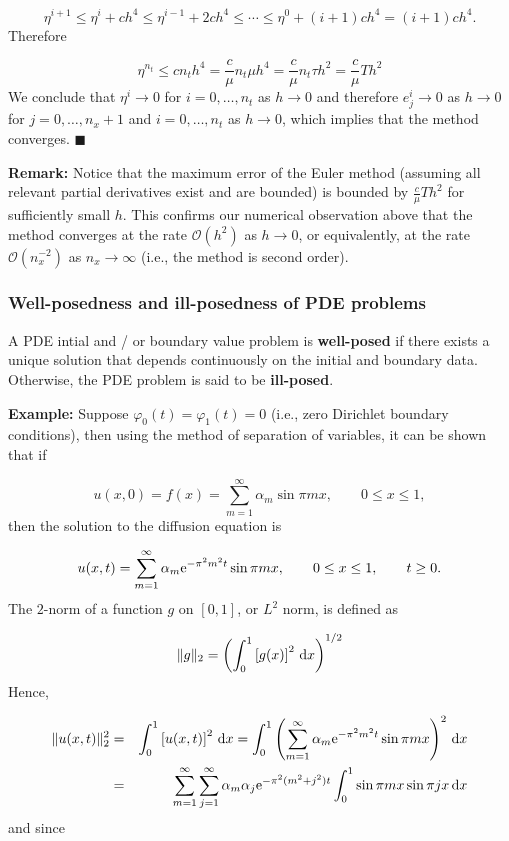 \documentclass[12pt,a4paper]{article}
\begin{document}
\[
\eta^{i+1} \leq \eta^i  + ch^4 \leq \eta^{i-1} + 2ch^4 \leq \cdots \leq \eta^{0} + (i+1)ch^4 = (i+1)ch^4.
\]
Therefore

\[
\eta^{n_t} \leq c n_th^4 = \frac{c}{\mu} n_t\mu h^4 = \frac{c}{\mu} n_t\tau h^2 = \frac{c}{\mu}T h^2 
\]
We conclude that $\eta^i \to 0$ for $i = 0, \ldots, n_t$ as $h \to 0$ and therefore $e^i_j \to 0$ as $h \to 0$ for $j = 0, \ldots, n_x + 1$ and $i = 0, \ldots, n_t$ as $h \to 0$, which implies that the method converges.   $\blacksquare$

\textbf{Remark:} Notice that the maximum error of the Euler method (assuming all relevant partial derivatives exist and are bounded) is bounded by $\frac{c}{\mu}T h^2$ for sufficiently small $h$. This confirms our numerical observation above that the method converges at the rate $\mathcal{O}(h^2)$ as $h \to 0$, or equivalently, at the rate $\mathcal{O}(n_x^{-2})$ as $n_x \to \infty$ (i.e., the method is second order).

\subsubsection{Well-posedness and ill-posedness of PDE problems}
A PDE intial and / or boundary value problem is \textbf{well-posed} if there exists a unique solution that depends continuously on the initial and boundary data.  Otherwise, the PDE problem is said to be \textbf{ill-posed}.

\textbf{Example:}  Suppose $\varphi_0(t) = \varphi_1(t) = 0$ (i.e., zero Dirichlet boundary conditions), then using the method of separation of variables, it can be shown that if

\[
u(x,0) = f(x) = \sum_{m = 1}^{\infty}\alpha_m \sin \pi m x, \qquad 0 \leq x \leq 1,
\]
then the solution to the diffusion equation is

\[
u(x,t) = \sum_{m = 1}^{\infty}\alpha_m {\rm e}^{-\pi^2m^2 t} \sin \pi m x, \qquad 0 \leq x \leq 1, \qquad t \geq 0.
\]
The $2$-norm of a function $g$ on $[0, 1]$, or $L^2$ norm, is defined as

\[
\| g \|_2 = \left( \int_0^1 \left[g(x)\right]^2\,{\rm d}x   \right)^{1/2}
\]
Hence,


\begin{eqnarray*}
\|u(x,t)\|_2^2 &=& \int_0^1 \left[u(x,t)\right]^2\,{\rm d}x  = \int_0^1 \left(\sum_{m = 1}^{\infty}\alpha_m {\rm e}^{-\pi^2m^2 t} \sin \pi m x  \right)^2\,{\rm d}x \\
&=& \sum_{m=1}^{\infty}\sum_{j=1}^{\infty} \alpha_m \alpha_j{\rm e}^{-\pi^2(m^2 + j^2) t}\int_0^1 \sin\pi m x\sin \pi j x\, {\rm d}x
\end{eqnarray*}
and since
\end{document}

